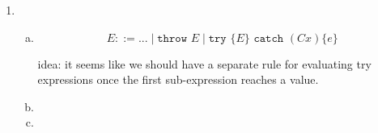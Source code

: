 \documentclass[10pt, oneside]{article}
\begin{document}
\begin{enumerate}[1.]
	\item
	\begin{enumerate}[(a)]
		\item
		$$E ::= ... \mid \texttt{throw } E \mid \texttt{try }\{E\} \texttt{ catch } (C x) \{e\} $$
		
		idea: it seems like we should have a separate rule for evaluating try 
		expressions once the first sub-expression reaches a value.
		\item
		\item
	\end{enumerate}
\end{enumerate}
\end{document}
